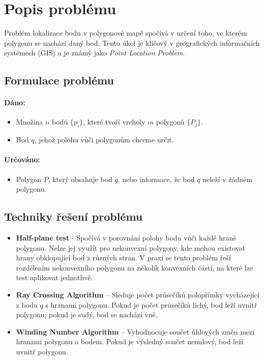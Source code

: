 \section{Popis problému}

Problém lokalizace bodu v polygonové mapě spočívá v určení toho, ve kterém polygonu se nachází daný bod. Tento úkol je klíčový v geografických informačních systémech (GIS) a je známý jako \textit{Point Location Problem}\cite{Bayer2008}.

\subsection{Formulace problému}

\paragraph{Dáno:}
\begin{itemize}
    \item Množina \( n \) bodů \(\{p_i\}\), které tvoří vrcholy \( m \) polygonů \(\{P_j\}\).
    \item Bod \( q \), jehož polohu vůči polygonům chceme určit.
\end{itemize}

\paragraph{Určováno:}
\begin{itemize}
    \item Polygon \( P \), který obsahuje bod \( q \), nebo informace, že bod \( q \) neleží v žádném polygonu.
\end{itemize}

\subsection{Techniky řešení problému}

\begin{itemize}
    \item \textbf{Half-plane test} - Spočívá v porovnání polohy bodu vůči každé hraně polygonu. Nelze jej využít pro nekonvexní polygony, kde mohou existovat hrany obklopující bod z různých stran. V praxi se tento problém řeší rozdělením nekonvexního polygonu na několik konvexních částí, na které lze test aplikovat jednotlivě.
    
    \item \textbf{Ray Crossing Algorithm} – Sleduje počet průsečíků polopřímky vycházející z bodu \( q \) s hranami polygonu. Pokud je počet průsečíků lichý, bod leží uvnitř polygonu; pokud je sudý, bod se nachází vně.
    
    \item \textbf{Winding Number Algorithm} – Vyhodnocuje součet úhlových změn mezi hranami polygonu a bodem. Pokud je výsledný součet nenulový, bod leží uvnitř polygonu.
\end{itemize}

